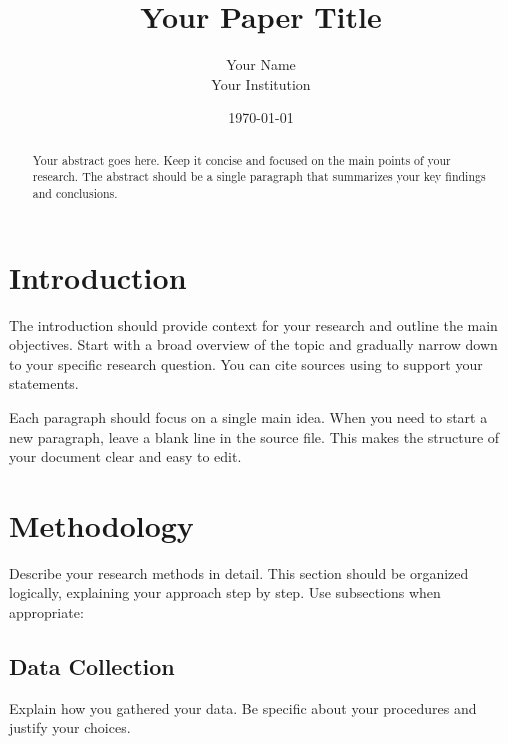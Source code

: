 \documentclass[12pt, titlepage]{article}
\title{\vspace{-1.5in}Your Paper Title}
\author{Your Name\\Your Institution}
\date{\today}
\begin{document}
\maketitle
\thispagestyle{empty}  %

\begin{abstract}
  Your abstract goes here. Keep it concise and focused on the main points of your 
  research. The abstract should be a single paragraph that summarizes your key 
  findings and conclusions.
\end{abstract}

\section{Introduction}
  The introduction should provide context for your research and outline the main 
  objectives. Start with a broad overview of the topic and gradually narrow down 
  to your specific research question. You can cite sources using 
  \cite{example2024} to support your statements.

  Each paragraph should focus on a single main idea. When you need to start a new 
  paragraph, leave a blank line in the source file. This makes the structure of 
  your document clear and easy to edit.

\section{Methodology}
  Describe your research methods in detail. This section should be organized 
  logically, explaining your approach step by step. Use subsections when 
  appropriate:

  \subsection{Data Collection}
    Explain how you gathered your data. Be specific about your procedures and 
    justify your choices.
\end{document}
